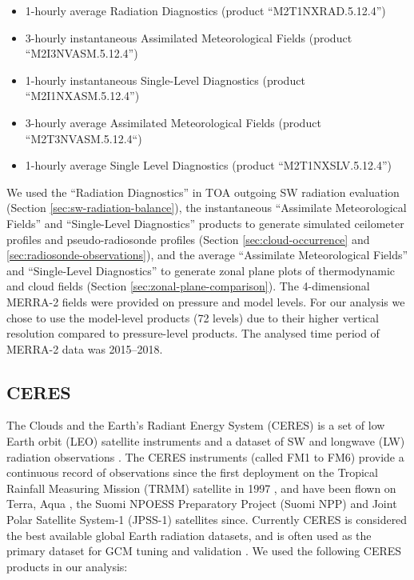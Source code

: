 \begin{itemize}
\item 1-hourly average Radiation Diagnostics (product ``M2T1NXRAD.5.12.4'')
\item 3-hourly instantaneous Assimilated Meteorological Fields (product
``M2I3NVASM.5.12.4'')
\item 1-hourly instantaneous Single-Level Diagnostics (product
``M2I1NXASM.5.12.4'')
\item 3-hourly average Assimilated Meteorological Fields (product
``M2T3NVASM.5.12.4``)
\item 1-hourly average Single Level Diagnostics (product ``M2T1NXSLV.5.12.4'')
\end{itemize}

We used the ``Radiation Diagnostics'' in TOA outgoing SW radiation evaluation (Section
\ref{sec:sw-radiation-balance}), the instantaneous ``Assimilate Meteorological
Fields'' and ``Single-Level Diagnostics'' products to generate simulated
ceilometer profiles and pseudo-radiosonde profiles (Section
\ref{sec:cloud-occurrence} and \ref{sec:radiosonde-observations}), and the
average ``Assimilate Meteorological Fields'' and ``Single-Level Diagnostics'' to
generate zonal plane plots of thermodynamic and cloud fields (Section
\ref{sec:zonal-plane-comparison}). The 4-dimensional MERRA-2 fields were
provided on pressure and model levels. For our analysis we chose to use the
model-level products (72 levels) due to their higher vertical resolution
compared to pressure-level products. The analysed time period of MERRA-2 data
was 2015--2018.

\subsection{CERES}

The Clouds and the Earth's Radiant Energy System (CERES) is a set of low Earth
orbit (LEO) satellite instruments and a dataset of SW and longwave (LW)
radiation observations \citep{loeb2018,doelling2016}. The CERES instruments
(called FM1 to FM6) provide a continuous record of observations since the first
deployment on the Tropical Rainfall Measuring Mission (TRMM) satellite in 1997
\citep{simpson1996}, and have been flown on Terra, Aqua \citep{parkinson2003},
the Suomi NPOESS Preparatory Project (Suomi NPP) and Joint Polar Satellite
System-1 (JPSS-1) \citep{goldberg2013} satellites since. Currently CERES is
considered the best available global Earth radiation datasets, and is often used
as the primary dataset for GCM tuning and validation
\citep{schmidt2017,hourdin2017}. We used the following CERES products in our
analysis:

